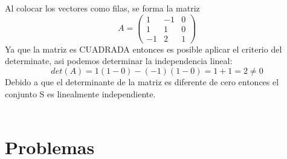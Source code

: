 Al colocar los vectores como filas, se forma la matriz
\[A=
\left(
\begin{array}{rrr}
1&-1&0\\
1&1&0\\
-1&2&1
\end{array}
\right)
\]
Ya que la matriz es CUADRADA entonces es posible aplicar el criterio del determinate, asi podemos determinar la independencia lineal:
\[det(A)=1(1-0)-(-1)(1-0)=1+1=2\neq 0\]
Debido a que el determinante de la matriz es diferente de cero entonces el conjunto S es linealmente independiente.
~\\
~\\



\section{Problemas}

